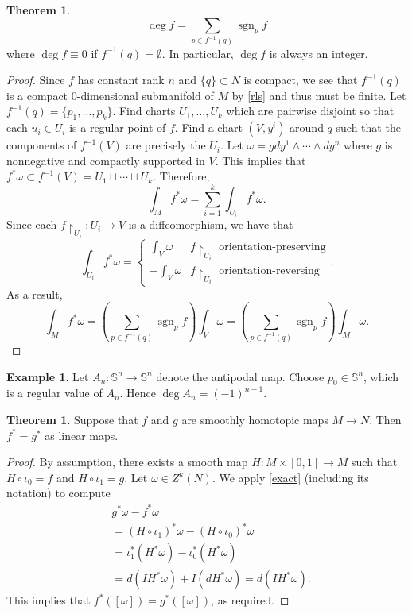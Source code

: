 \documentclass[10pt,letterpaper,cm]{nupset}
\theoremstyle{definition}
\newtheorem{exmp}[definition]{Example}
\theoremstyle{theorem}
\newtheorem{theorem}[definition]{Theorem}
\theoremstyle{remark}
\renewcommand{\S}{\mathbb S}
\newcommand{\1}{\mathbf{1}}
\newcommand{\0}{\vec 0}
\DeclareMathOperator{\sgn}{sgn}
\begin{document}
\begin{theorem}
$$\deg f = \sum_{p\in f^{-1}(q)} \sgn_pf$$ where $\deg f \equiv 0$ if $f^{-1}(q) = \emptyset$.
In particular, $\deg f$ is always an integer. 
\end{theorem}
\begin{proof}
Since $f$ has constant rank $n$ and $\{q\}\subset N$ is compact, we see that $f^{-1}(q)$ is a compact $0$-dimensional submanifold  of $M$ by \cref{rls}  and thus must be finite. Let $f^{-1}(q) = \{p_1, \ldots, p_k\}$. Find  charts $U_1, \ldots, U_k$ which are pairwise disjoint so that each $u_i \in U_i$ is a regular point of $f$. Find a chart $(V, y^i)$ around $q$ such that the components of $f^{-1}(V)$ are precisely the $U_i$. Let $\omega = gdy^1 \wedge \cdots \wedge dy^n$ where $g$ is nonnegative and compactly supported in $V$. This implies that $f^{\ast}\omega \subset f^{-1}(V) =U_1 \sqcup \cdots \sqcup U_k$. Therefore, $$  \int_Mf^{\ast}\omega =\sum_{i=1}^k\int_{U_i}f^{\ast}\omega .$$ Since each $f\restriction_{U_i} : U_i \to V$ is a diffeomorphism, we have that $$ \int_{U_i}f^{\ast}\omega =
\begin{cases}
\int_{V} \omega & f\restriction_{U_i}  \text{ orientation-preserving} 
\\ {-\int_V\omega}  & f\restriction_{U_i} \text{ orientation-reversing}
\end{cases} .$$ As a result, $$\int_M f^{\ast} \omega  =\left(\sum_{p\in f^{-1}(q)} \sgn_pf \right)\int_V \omega =\left(\sum_{p\in f^{-1}(q)} \sgn_pf \right)\int_M \omega .$$
\end{proof}

\begin{exmp}
Let $A_n: \S^n \to \S^n$ denote the antipodal map. Choose $p_0 \in \S^n$, which is a regular value of $A_n$. Hence $\deg A_n = ({-1})^{n-1}$.
\end{exmp}

\begin{theorem}
Suppose that $f$ and $g$ are smoothly homotopic maps $ M \to N$. Then $f^{\ast} = g^{\ast}$ as linear maps.
\end{theorem}
\begin{proof}
By assumption, there exists a smooth map $H: M \times \left[0,1\right] \to M$ such that $H \circ \iota_0 =f$ and $H \circ \iota_1 = g$. Let $\omega \in Z^k(N)$. We apply \cref{exact} (including its notation) to compute
\begin{align*}
& g^{\ast} \omega - f^{\ast} \omega 
\\ & = \left(H \circ \iota_1\right)^{\ast} \omega - \left(H \circ \iota_0\right)^{\ast} \omega
\\ & = \iota_1^{\ast} (H^{\ast} \omega) -  \iota_0^{\ast} (H^{\ast} \omega)
\\ & = d(IH^{\ast}\omega)+I(dH^{\ast}\omega) = d(IH^{\ast}\omega).
\end{align*} 
This implies that $f^{\ast}([\omega]) = g^{\ast}([\omega])$, as required. 
\end{proof}
\end{document}
